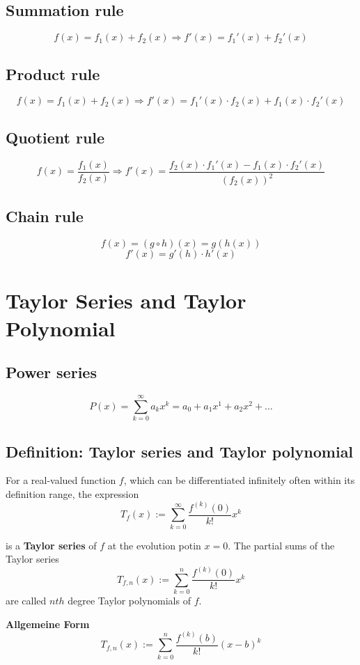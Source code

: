 \documentclass{book}
\begin{document}
\subsection{Summation rule}
\[
  f(x) = f_1(x) + f_2(x) \Longrightarrow f'(x)=f_1'(x)+f_2'(x)
\]


\subsection{Product rule}
\[
  f(x) = f_1(x) + f_2(x) \Longrightarrow f'(x)=f_1'(x) \cdot f_2(x) + f_1(x) \cdot f_2'(x)
\]

\subsection{Quotient rule}
\[
  f(x) = \frac{f_1(x)}{f_2(x)} \Longrightarrow f'(x) = \frac{f_2(x) \cdot f_1'(x) - f_1(x) \cdot f_2'(x)}{(f_2(x))^2}
\]

\subsection{Chain rule}
\[
  f(x) = (g \circ h)(x) = g(h(x))
\]
\[
  f'(x) = g'(h) \cdot h'(x)
\]

\section{Taylor Series and Taylor Polynomial}

\subsection{Power series}
\[
  P(x) = \sum_{k=0}^{\infty} a_kx^k = a_0 + a_1x^1 + a_2x^2+ \dots
\]

\subsection{Definition: Taylor series and Taylor polynomial}

For a real-valued function $f$, which can be differentiated infinitely often within its definition range, the expression
\[
  T_f(x) := \sum_{k=0}^\infty \frac{f^{(k)}(0)}{k!}x^k
\]

is a \textbf{Taylor series} of $f$ at the evolution potin $x=0$. The partial sums of the Taylor series
\[
  T_{f, n}(x) := \sum_{k=0}^n \frac{f^{(k)}(0)}{k!}x^k
\]
are called $nth$ degree Taylor polynomials of $f$.

\textbf{Allgemeine Form}
\[
  T_{f, n}(x) := \sum_{k=0}^n \frac{f^{(k)}(b)}{k!}(x-b)^k
\]
\end{document}
